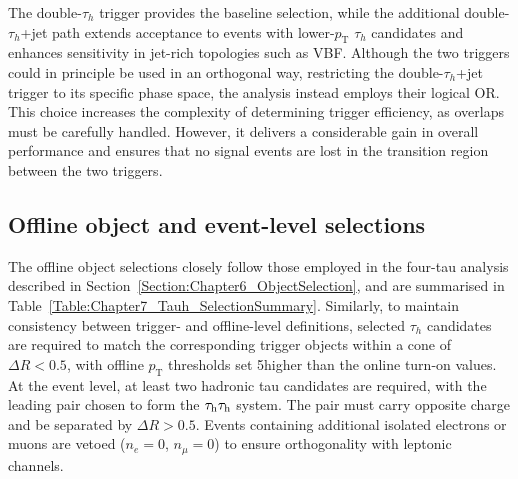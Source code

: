 The double-$\tau_h$ trigger provides the baseline selection, while the additional double-$\tau_h$+jet path extends acceptance to events with lower-$p_\text{T}$ $\tau_h$ candidates and enhances sensitivity in jet-rich topologies such as \ac{VBF}. Although the two triggers could in principle be used in an orthogonal way, restricting the double-$\tau_h$+jet trigger to its specific phase space, the analysis instead employs their logical OR. This choice increases the complexity of determining trigger efficiency, as overlaps must be carefully handled. However, it delivers a considerable gain in overall performance and ensures that no signal events are lost in the transition region between the two triggers. 

\subsection{Offline object and event-level selections}
\label{Section:Chapter7_OfflineSelections}
The offline object selections closely follow those employed in the four-tau analysis described in Section~\ref{Section:Chapter6_ObjectSelection}, and are summarised in Table~\ref{Table:Chapter7_Tauh_SelectionSummary}. Similarly, to maintain consistency between trigger- and offline-level definitions, selected $\tau_h$ candidates are required to match the corresponding trigger objects within a cone of $\Delta R < 0.5$, with offline $p_\text{T}$ thresholds set 5\GeV higher than the online turn-on values. At the event level, at least two hadronic tau candidates are required, with the leading pair chosen to form the $\tau_\mathrm{h}\tau_\mathrm{h}$ system. The pair must carry opposite charge and be separated by $\Delta R > 0.5$. Events containing additional isolated electrons or muons are vetoed ($n_e = 0$, $n_\mu = 0$) to ensure orthogonality with leptonic channels. 


